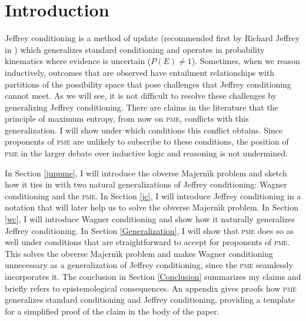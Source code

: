 \documentclass[entropy,article,accept,oneauthor,pdftex,12pt,a4paper]{mdpi}
\begin{document}





\section{Introduction}
\label{Introduction}

Jeffrey conditioning is a method of update (recommended first by
Richard Jeffrey in \cite{ref-13}) which generalizes standard conditioning and
operates in probability kinematics where evidence is uncertain
($P(E)\neq{}1$). Sometimes, when we reason inductively, outcomes that
are observed have entailment relationships with partitions of the
possibility space that pose challenges that Jeffrey conditioning
cannot meet. As we will see, it is not difficult to resolve these
challenges by generalizing Jeffrey conditioning. There are claims in
the literature that the principle of maximum entropy, from now on
\textsc{pme}, conflicts with this generalization. I will show under
which conditions this conflict obtains. Since proponents of
\textsc{pme} are unlikely to subscribe to these conditions, the
position of \textsc{pme} in the larger debate over inductive logic and
reasoning is not undermined.

In Section \ref{juppme}, I will introduce the obverse Majern{\'\i}k
problem and sketch how it ties in with two natural generalizations of
Jeffrey conditioning: Wagner conditioning and the \textsc{pme}. In
Section \ref{jc}, I will introduce Jeffrey conditioning in a notation
that will later help us to solve the obverse Majern{\'\i}k problem. In
Section \ref{wc}, I will introduce Wagner conditioning and show how it
naturally generalizes Jeffrey conditioning. In Section
\ref{Generalization}, I will show that \textsc{pme} does so as well
under conditions that are straightforward to accept for proponents of
\textsc{pme}. This solves the obverse Majern{\'\i}k problem and makes
Wagner conditioning unnecessary as a generalization of Jeffrey
conditioning, since the \textsc{pme} seamlessly incorporates it. The
conclusion in Section \ref{Conclusion} summarizes my claims and
briefly refers to epistemological consequences. An appendix gives
proofs how \textsc{pme} generalizes standard conditioning and Jeffrey
conditioning, providing a template for a simplified proof of the claim
in the body of the paper.
\end{document}
